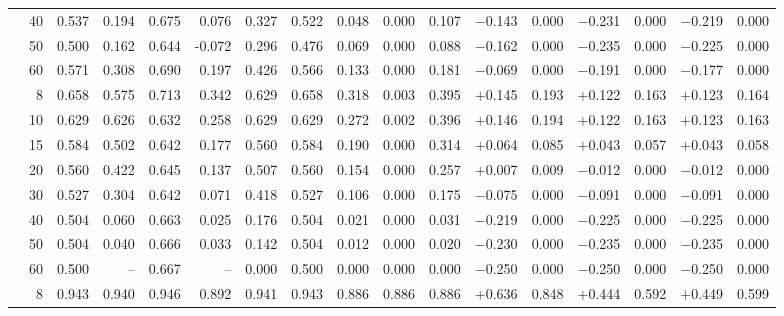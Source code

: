 \documentclass[conference]{IEEEtran}
\theoremstyle{remark}
\begin{document}
\begin{table}[ht]
{\begin{tabular}{p{1.55cm}r rrrr rr rr r rr rr rr}
  & 40 & 0.537 & 0.194 & 0.675 & 0.076 & 0.327 & 0.522 & 0.048 & 0.000 & 0.107 & $-$0.143 & 0.000 & $-$0.231 & 0.000 & $-$0.219 & 0.000 \\
  & 50 & 0.500 & 0.162 & 0.644 & -0.072 & 0.296 & 0.476 & 0.069 & 0.000 & 0.088 & $-$0.162 & 0.000 & $-$0.235 & 0.000 & $-$0.225 & 0.000 \\
  & 60 & 0.571 & 0.308 & 0.690 & 0.197 & 0.426 & 0.566 & 0.133 & 0.000 & 0.181 & $-$0.069 & 0.000 & $-$0.191 & 0.000 & $-$0.177 & 0.000 \\
\midrule
{}
  & 8 & 0.658 & 0.575 & 0.713 & 0.342 & 0.629 & 0.658 & 0.318 & 0.003 & 0.395 & $+$0.145 & 0.193 & $+$0.122 & 0.163 & $+$0.123 & 0.164 \\
  & 10 & 0.629 & 0.626 & 0.632 & 0.258 & 0.629 & 0.629 & 0.272 & 0.002 & 0.396 & $+$0.146 & 0.194 & $+$0.122 & 0.163 & $+$0.123 & 0.163 \\
  & 15 & 0.584 & 0.502 & 0.642 & 0.177 & 0.560 & 0.584 & 0.190 & 0.000 & 0.314 & $+$0.064 & 0.085 & $+$0.043 & 0.057 & $+$0.043 & 0.058 \\
  & 20 & 0.560 & 0.422 & 0.645 & 0.137 & 0.507 & 0.560 & 0.154 & 0.000 & 0.257 & $+$0.007 & 0.009 & $-$0.012 & 0.000 & $-$0.012 & 0.000 \\
  & 30 & 0.527 & 0.304 & 0.642 & 0.071 & 0.418 & 0.527 & 0.106 & 0.000 & 0.175 & $-$0.075 & 0.000 & $-$0.091 & 0.000 & $-$0.091 & 0.000 \\
  & 40 & 0.504 & 0.060 & 0.663 & 0.025 & 0.176 & 0.504 & 0.021 & 0.000 & 0.031 & $-$0.219 & 0.000 & $-$0.225 & 0.000 & $-$0.225 & 0.000 \\
  & 50 & 0.504 & 0.040 & 0.666 & 0.033 & 0.142 & 0.504 & 0.012 & 0.000 & 0.020 & $-$0.230 & 0.000 & $-$0.235 & 0.000 & $-$0.235 & 0.000 \\
  & 60 & 0.500 & -- & 0.667 & -- & 0.000 & 0.500 & 0.000 & 0.000 & 0.000 & $-$0.250 & 0.000 & $-$0.250 & 0.000 & $-$0.250 & 0.000 \\
\midrule
{}
  & 8 & 0.943 & 0.940 & 0.946 & 0.892 & 0.941 & 0.943 & 0.886 & 0.886 & 0.886 & $+$0.636 & 0.848 & $+$0.444 & 0.592 & $+$0.449 & 0.599 \\

\end{tabular}}
\end{table}
\end{document}
